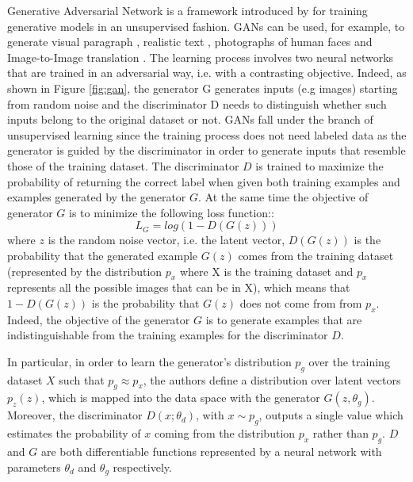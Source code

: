 Generative Adversarial Network is a framework introduced by \citet{art:gan} for training generative models in an unsupervised fashion. GANs can be used, for example, to generate visual paragraph \citep{Liang_2017_ICCV}, realistic text \citep{pmlr-v70-zhang17b}, photographs of human faces \citep{https://doi.org/10.48550/arxiv.1710.10196} and Image-to-Image translation \citep{Isola_2017_CVPR}.
The learning process involves two neural networks that are trained in an adversarial way, i.e. with a contrasting objective. Indeed, as shown in Figure \ref{fig:gan}, the generator G generates inputs (e.g images) starting from random noise and the discriminator D needs to distinguish whether such inputs belong to the original dataset or not. GANs fall under the branch of unsupervised learning since the training process does not need labeled data as the generator is guided by the discriminator in order to generate inputs that resemble those of the training dataset. The discriminator $D$ is trained to maximize the probability of returning the correct label when given both training examples and examples generated by the generator $G$. At the same time the objective of generator $G$ is to minimize the following loss function::
\begin{equation}
  \label{eq:gloss}
  L_G =log(1-D(G(z)))
\end{equation}
where $z$ is the random noise vector, i.e. the latent vector, $D(G(z))$ is the probability that the generated example $G(z)$ comes from the training dataset (represented by the distribution $p_{x}$ where X is the training dataset and $p_{x}$ represents all the possible images that can be in X), which means that $1-D(G(z))$ is the probability that $G(z)$ does not come from from $p_{x}$. Indeed, the objective of the generator $G$ is to generate examples that are indistinguishable from the training examples for the discriminator $D$.

In particular, in order to learn the generator's distribution $p_{g}$ over the training dataset $X$ such that $p_{g}\approx p_{x}$, the authors define a distribution over latent vectors $p_{z}(z)$, which is mapped into the data space with the generator $G(z, \theta_{g})$. Moreover, the discriminator $D(x;\theta_{d})$, with $x \sim p_{g}$, outputs a single value which estimates the probability of $x$ coming from the distribution $p_{x}$ rather than $p_{g}$. $D$ and $G$ are both differentiable functions represented by a neural network with parameters $\theta_{d}$ and $\theta_{g}$ respectively.

